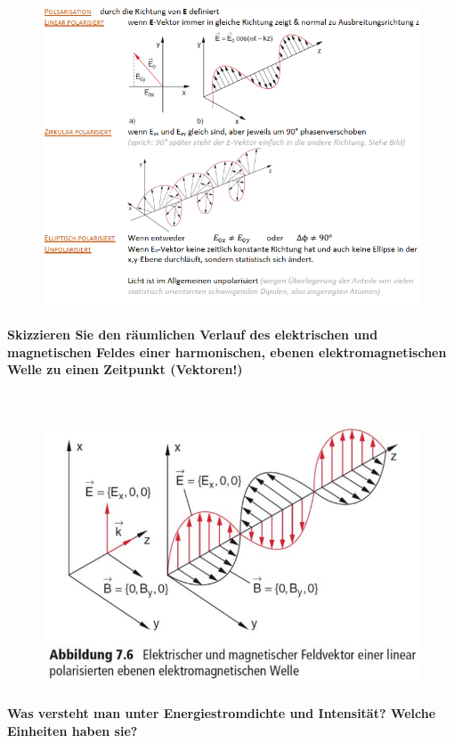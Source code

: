 \documentclass[a4paper, 11pt, ngerman, parskip=half-]{scrartcl}
\begin{document}
\begin{figure}[H]
    \centering
    \includegraphics[width=14cm]{image/13/3.png}
\end{figure}

\paragraph{Skizzieren Sie den räumlichen Verlauf des elektrischen und magnetischen Feldes einer
harmonischen, ebenen elektromagnetischen Welle zu einen Zeitpunkt (Vektoren!)} ~

\begin{figure}[H]
    \centering
    \includegraphics[width=10 cm]{image/13/4.png}
\end{figure}

\paragraph{Was versteht man unter Energiestromdichte und Intensität? Welche Einheiten haben sie?} ~
\end{document}
